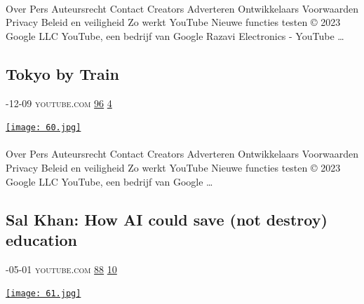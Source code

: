 \documentclass[10pt,a4paper]{article}
\begin{document}
\begin{multicols}{2}
\paragraph{}
Over
Pers
Auteursrecht
Contact
Creators
Adverteren
Ontwikkelaars
Voorwaarden
Privacy
Beleid en veiligheid
Zo werkt YouTube
Nieuwe functies testen
© 2023 Google LLC
YouTube, een bedrijf van Google
Razavi Electronics - YouTube
\dots\par
\noindent\begin{minipage}{\linewidth}
\medskip
\subsection{Tokyo by Train}
\textsc{\footnotesize
{\scriptsize\faCalendar}-12-09 
{\scriptsize\faYoutube}\space 
youtube.com 
{\scriptsize\faThumbsOUp}\space 
\href{http://news.ycombinator.com/item?id=37276630\&utm\_term=comment}{96} 
{\scriptsize\faComments}\space 
\href{http://news.ycombinator.com/item?id=37276630\&utm\_term=comment}{4} 
}
\par\medskip\noindent
\href{https://www.youtube.com/watch?v=Y49VfddU-L4\&utm\_source=hackernewsletter\&utm\_medium=email\&utm\_term=watching}{
    \texttt{[image: 60.jpg]}
}
\end{minipage}
\paragraph{}
Over
Pers
Auteursrecht
Contact
Creators
Adverteren
Ontwikkelaars
Voorwaarden
Privacy
Beleid en veiligheid
Zo werkt YouTube
Nieuwe functies testen
© 2023 Google LLC
YouTube, een bedrijf van Google
\dots\par
\noindent\begin{minipage}{\linewidth}
\medskip
\subsection{Sal Khan: How AI could save (not destroy) education}
\textsc{\footnotesize
{\scriptsize\faCalendar}-05-01 
{\scriptsize\faYoutube}\space 
youtube.com 
{\scriptsize\faThumbsOUp}\space 
\href{http://news.ycombinator.com/item?id=37283191\&utm\_term=comment}{88} 
{\scriptsize\faComments}\space 
\href{http://news.ycombinator.com/item?id=37283191\&utm\_term=comment}{10} 
}
\par\medskip\noindent
\href{https://www.youtube.com/watch?v=hJP5GqnTrNo\&utm\_source=hackernewsletter\&utm\_medium=email\&utm\_term=watching}{
    \texttt{[image: 61.jpg]}
}
\end{minipage}

\end{multicols}
\end{document}
